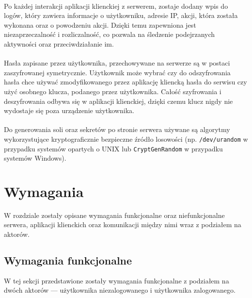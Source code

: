 \documentclass{article}
\begin{document}
    \paragraph{}Po każdej interakcji aplikacji klienckiej z serwerem, zostaje dodany wpis do logów, który zawiera informacje o użytkowniku, adresie IP, akcji, która została wykonana oraz o powodzeniu akcji. Dzięki temu zapewniona jest niezaprzeczalność i rozliczalność, co pozwala na śledzenie podejrzanych aktywności oraz przeciwdziałanie im.

    \paragraph{}Hasła zapisane przez użytkownika, przechowywane na serwerze są w postaci zaszyfrowanej symetrycznie. Użytkownik może wybrać czy do odszyfrowania hasła chce używać zmodyfikowanego przez aplikację kliencką hasła do serwisu czy użyć osobnego klucza, podanego przez użytkownika. Całość szyfrowania i deszyfrowania odbywa się w aplikacji klienckiej, dzięki czemu klucz nigdy nie wydostaje się poza urządzenie użytkownika.

    \paragraph{}Do generowania soli oraz sekretów po stronie serwera używane są algorytmy wykorzystujące kryptograficznie bezpieczne źródło losowości (np. \texttt{/dev/urandom} w przypadku systemów opartych o UNIX lub \texttt{CryptGenRandom} w przypadku systemów Windows).





    \section{Wymagania}
    \paragraph{}W rozdziale zostały opisane wymagania funkcjonalne oraz niefunkcjonalne serwera, aplikacji klienckich oraz komunikacji między nimi wraz z podziałem na aktorów.

    \subsection{Wymagania funkcjonalne}
    W tej sekcji przedstawione zostały wymagania funkcjonalne z podziałem na dwóch aktorów --- użytkownika niezalogowanego i użytkownika zalogowanego.
\end{document}
